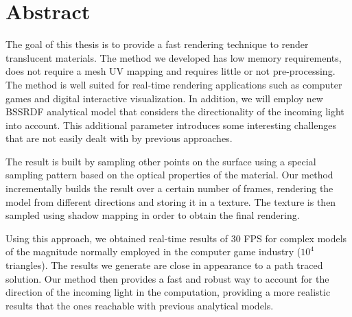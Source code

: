 \chapter{Abstract}

The goal of this thesis is to provide a fast rendering technique to render translucent materials. The method we developed has low memory requirements, does not require a mesh UV mapping and requires little or not pre-processing. The method is well suited for real-time rendering applications such as computer games and digital interactive visualization. In addition, we will employ new BSSRDF analytical model that considers the directionality of the incoming light into account. This additional parameter introduces some interesting challenges that are not easily dealt with by previous approaches. 

The result is built by sampling other points on the surface using a special sampling pattern based on the optical properties of the material. Our method incrementally builds the result over a certain number of frames, rendering the model from different directions and storing it in a texture. The texture is then sampled using shadow mapping in order to obtain the final rendering. 

Using this approach, we obtained real-time results of 30 FPS for complex models of the magnitude normally employed in the computer game industry ($10^4$ triangles). The results we generate are close in appearance to a path traced solution. Our method then provides a fast and robust way to account for the direction of the incoming light in the computation, providing a more realistic results that the ones reachable with previous analytical models. 